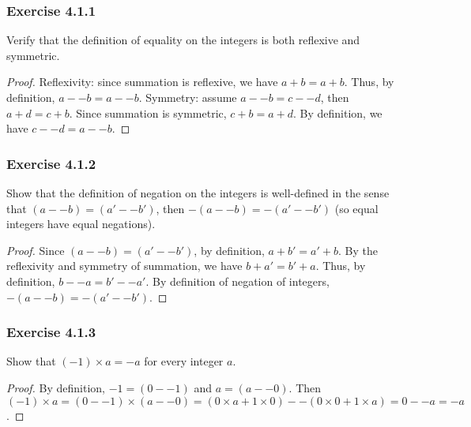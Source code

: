 \documentclass[12pt, letter]{article}
\begin{document}
\subsubsection*{Exercise 4.1.1}
Verify that the definition of equality on the integers is both reflexive and symmetric.
\begin{proof}
    Reflexivity: since summation is reflexive, we have $a+b=a+b$. Thus, by definition, $a--b=a--b$. Symmetry: assume $a--b=c--d$, then $a+d=c+b$.
    Since summation is symmetric, $c+b=a+d$. By definition, we have $c--d=a--b$.
\end{proof}
\subsubsection*{Exercise 4.1.2}
Show that the definition of negation on the integers is well-defined in the sense that $(a--b)=(a'--b')$, then $-(a--b)=-(a'--b')$ (so equal integers have equal negations).
\begin{proof}
    Since $(a--b)=(a'--b')$, by definition, $a+b'=a'+b$. By the reflexivity and symmetry of summation, we have $b+a'=b'+a$. Thus, by definition, 
    $b--a=b'--a'$. By definition of negation of integers, $-(a--b)=-(a'--b')$.
\end{proof}
\subsubsection*{Exercise 4.1.3}
Show that $(-1)\times a=-a$ for every integer $a$.
\begin{proof}
    By definition, $-1=(0--1)$ and $a=(a--0)$. Then $(-1)\times a=(0--1)\times (a--0)=(0\times a+1\times 0)--(0\times 0+1\times a)=0--a=-a$.
\end{proof}
\end{document}
